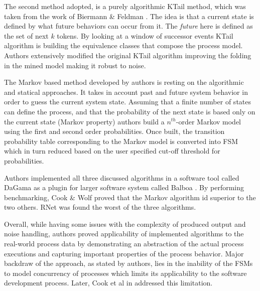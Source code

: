 The second method adopted, is a purely algorithmic KTail method, which was taken from the work of Biermann \& Feldman \cite{citeulike:5120603}. The idea is that a current state is defined by what future behaviors can occur from it. The \textit{future} here is defined as the set of next $k$ tokens. By looking at a window of successor events KTail algorithm is building the equivalence classes that compose the process model. Authors extensively modified the original KTail algorithm improving the folding in the mined model making it robust to noise.

The Markov based method developed by authors is resting on the algorithmic and statical approaches. It takes in account past and future system behavior in order to guess the current system state. Assuming that a finite number of states can define the process, and that the probability of the next state is based only on the current state (Markov property) authors build a $n^{th}$-order Markov model using the first and second order probabilities. Once built, the transition probability table corresponding to the Markov model is converted into FSM which in turn reduced based on the user specified cut-off threshold for probabilities.

Authors implemented all three discussed algorithms in a software tool called DaGama as a plugin for larger software system called Balboa \cite{citeulike:5120757}. By performing benchmarking, Cook \& Wolf proved that the Markov algorithm id superior to the two others. RNet was found the worst of the three algorithms. 

Overall, while having some issues with the complexity of produced output and noise handling, authors proved applicability of implemented algorithms to the real-world process data by demonstrating an abstraction of the actual process executions and capturing important properties of the process behavior. Major backdraw of the approach, as stated by authors, lies in the inability of the FSMs to model concurrency of processes which limits its applicability to the software development process. Later, Cook et al in \cite{citeulike:5128143} addressed this limitation.
